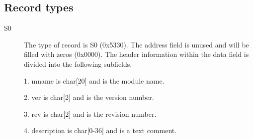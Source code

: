             \subsection{Record types}
                \begin{description}
                \item[S0]
                    The type of record is S0 (0x5330). The address field is unused
                    and will be filled with zeros (0x0000). The header information
                    within the data field is divided into the following subfields.

                        1.  mname is char[20] and is the module name.

                        2.  ver is char[2] and is the version number.

                        3.  rev is char[2] and is the revision number.

                        4.  description is char[0-36] and is a text comment.


\end{description}
